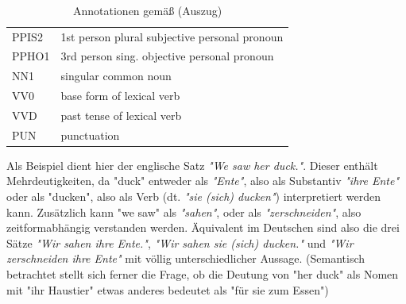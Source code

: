 \documentclass[12pt]{report}
\begin{document}
\begin{table}[h]
\tt
\begin{tabular}{ll}
PPIS2	& 1st person plural subjective personal pronoun \\
PPHO1	& 3rd person sing. objective personal pronoun\\
NN1		& singular common noun \\
VV0		& base form of lexical verb \\
VVD		& past tense of lexical verb \\
PUN		& punctuation
\end{tabular}
\caption{Annotationen gemäß \cite{clw7} (Auszug)}
\end{table} 

\rm

Als Beispiel dient hier der englische Satz \textit{"We saw her duck."}. Dieser enthält Mehrdeutigkeiten, da "duck" entweder als \textit{"Ente"}, also als Substantiv \textit{"ihre Ente"} oder als "ducken", also als Verb (dt. \textit{"sie (sich) ducken"}) interpretiert werden kann. Zusätzlich kann "we saw" als \textit{"sahen"}, oder als \textit{"zerschneiden"}, also zeitformabhängig verstanden werden. Äquivalent im Deutschen sind also die drei Sätze \textit{"Wir sahen ihre Ente."}, \textit{"Wir sahen sie (sich) ducken."} und \textit{"Wir zerschneiden ihre Ente"} mit völlig unterschiedlicher Aussage. (Semantisch betrachtet stellt sich ferner die Frage, ob die Deutung von "her duck" als Nomen mit "ihr Haustier" etwas anderes bedeutet als "für sie zum Essen")
\end{document}

